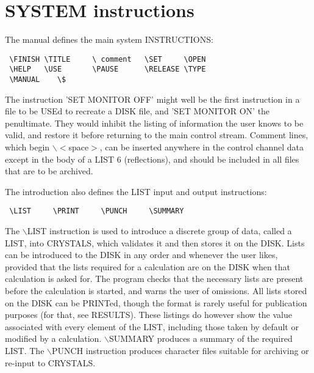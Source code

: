 \documentclass[10pt,a4paper]{report}
\begin{document}
\section{SYSTEM instructions}


The manual defines the main system INSTRUCTIONS:




\small\begin{verbatim}
 \FINISH \TITLE     \ comment   \SET     \OPEN      
 \HELP   \USE       \PAUSE      \RELEASE \TYPE    
 \MANUAL    \$
\end{verbatim}\normalsize




The instruction 'SET MONITOR OFF'
 might well be the first instruction in a file
 to be USEd to recreate a DISK file, 
 and 'SET MONITOR ON' the penultimate. They would inhibit the listing of
 information the user knows to be valid, and restore it before returning
 to the main control stream. Comment lines,
 which begin $\backslash$$<$space$>$, can be inserted anywhere in the control channel
 data except in the body of a LIST 6 (reflections), and should be 
 included in all files that are to be  archived.


The introduction also defines the LIST input and output instructions:



\small\begin{verbatim}
 \LIST     \PRINT     \PUNCH     \SUMMARY
\end{verbatim}\normalsize




The $\backslash$LIST instruction is used to introduce a discrete group of data, called
 a LIST, into CRYSTALS, which validates it and then stores it on the DISK.
 Lists can be introduced to the DISK in any order
 and whenever the user likes,
 provided that the lists required for a calculation are on the DISK when that
 calculation is asked for. The program checks that the necessary lists are
 present before the calculation is started, and warns the user of omissions.
 All lists stored on the DISK can be PRINTed, though the format is rarely
 useful for publication purposes (for that, see RESULTS). These listings do
 however show the value associated with every element of the LIST, including
 those taken by default or modified by a calculation. 
 $\backslash$SUMMARY produces a summary of the required LIST.
 The $\backslash$PUNCH instruction
 produces character files suitable for archiving or re-input to CRYSTALS.
\end{document}

